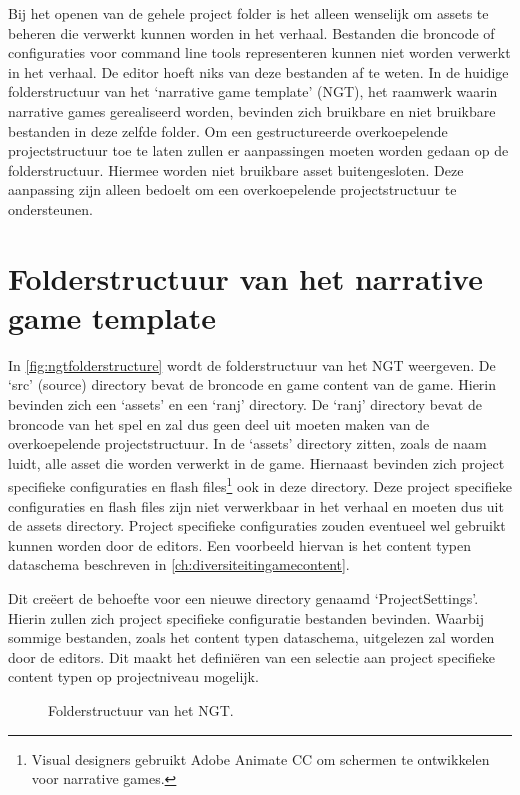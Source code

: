Bij het openen van de gehele project folder is het alleen wenselijk om assets te beheren die verwerkt kunnen worden in het verhaal. Bestanden die broncode of configuraties voor command line tools representeren kunnen niet worden verwerkt in het verhaal. De editor hoeft niks van deze bestanden af te weten. In de huidige folderstructuur van het ‘narrative game template’ (NGT), het raamwerk waarin narrative games gerealiseerd worden, bevinden zich bruikbare en niet bruikbare bestanden in deze zelfde folder. Om een gestructureerde overkoepelende projectstructuur toe te laten zullen er aanpassingen moeten worden gedaan op de folderstructuur. Hiermee worden niet bruikbare asset buitengesloten.
Deze aanpassing zijn alleen bedoelt om een overkoepelende projectstructuur te ondersteunen.

\section{Folderstructuur van het narrative game template}
In \autoref{fig:ngtfolderstructure} wordt de folderstructuur van het NGT weergeven. De ‘src’ (source) directory bevat de broncode en game content van de game. Hierin bevinden zich een ‘assets’ en een ‘ranj’ directory. De ‘ranj’ directory bevat de broncode van het spel en zal dus geen deel uit moeten maken van de overkoepelende projectstructuur. In de ‘assets’ directory zitten, zoals de naam luidt, alle asset die worden verwerkt in de game. Hiernaast bevinden zich project specifieke configuraties en flash files\footnote{Visual designers gebruikt Adobe Animate CC om schermen te ontwikkelen voor narrative games.} ook in deze directory. Deze project specifieke configuraties en flash files zijn niet verwerkbaar in het verhaal en moeten dus uit de assets directory. Project specifieke configuraties zouden eventueel wel gebruikt kunnen worden door de editors. Een voorbeeld hiervan is het content typen dataschema beschreven in \autoref{ch:diversiteitingamecontent}. 

Dit creëert de behoefte voor een nieuwe directory genaamd ‘ProjectSettings’. Hierin zullen zich project specifieke configuratie bestanden bevinden. Waarbij sommige bestanden, zoals het content typen dataschema, uitgelezen zal worden door de editors. Dit maakt het definiëren van een selectie aan project specifieke content typen op projectniveau mogelijk.

\begin{figure}[htb]
    \caption{Folderstructuur van het NGT.}
    \label{fig:ngtfolderstructure}
\end{figure}

